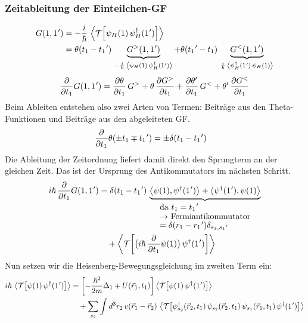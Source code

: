 \subsubsection*{Zeitableitung der Einteilchen-GF}
\begin{align}
  G(1,1\mkern1mu')
   & = -\frac{i}{\hbar}\,\left\langle\mathcal T\!\left[\psi_H(1)\,\psi_H^\dagger(1\mkern1mu')\right]\right\rangle \notag                                                                                                                                                           \\
   & = \theta(t_1-t_1\mkern1mu')\,\underbrace{G^>(1,1\mkern1mu')}_{-\frac{i}{\hbar}\,\left\langle\psi_H(1)\,\psi_H^\dagger(1\mkern1mu')\right\rangle} + \theta(t_1\mkern1mu'-t_1)\,\underbrace{G^<(1,1\mkern1mu')}_{\frac{i}{\hbar}\,\left\langle\psi_H^\dagger(1\mkern1mu')\,\psi_H(1)\right\rangle}
\end{align}
\begin{align}
  \frac{\partial}{\partial t_1} G(1,1\mkern1mu')
  = \frac{\partial \theta}{\partial t_1}\,G^> + \theta\,\frac{\partial G^>}{\partial t_1} + \frac{\partial \theta'}{\partial t_1}\,G^< + \theta'\,\frac{\partial G^<}{\partial t_1}
\end{align}
Beim Ableiten entstehen also zwei Arten von Termen: Beiträge aus den Theta-Funktionen und Beiträge aus den abgeleiteten GF\@.
\begin{align}
  \frac{\partial}{\partial t_1}\theta(\pm t_1\mp t_1\mkern1mu') & = \pm \delta(t_1-t_1\mkern1mu')
\end{align}
Die Ableitung der Zeitordnung liefert damit direkt den Sprungterm an der gleichen Zeit. Das ist der Ursprung des Antikommutators im nächsten Schritt.
\begin{align}
  i\hbar\,\frac{\partial}{\partial t_1}G(1,1\mkern1mu')
   & = \delta(t_1-t_1\mkern1mu')\,\underbrace{\erw{\psi(1),\psi^\dagger(1\mkern1mu')}+\erw{\psi^\dagger(1\mkern1mu'),\psi(1)}}_{\shortstack[l]{da $t_1=t_1\mkern1mu'$\\$\rightarrow$ Fermiantikommutator\\$=\delta(r_1-r_1\mkern1mu')\delta_{s_1,s_1\mkern1mu'}$}} \notag \\
   & \quad + \erw{\mathcal T\!\left[\bigl(i\hbar\,\frac{\partial}{\partial t_1}\psi(1)\bigr)\,\psi^\dagger(1\mkern1mu')\right]}
\end{align}
Nun setzen wir die Heisenberg-Bewegungsgleichung im zweiten Term ein:
\begin{align}
  i\hbar\,\left\langle\mathcal T\!\left[\psi(1)\,\psi^\dagger(1\mkern1mu')\right]\right\rangle
   & = \left[-\frac{\hbar^2}{2m}\Delta_{1} + U(\vec r_1,t_1)\right]\left\langle\mathcal T\!\left[\psi(1)\,\psi^\dagger(1\mkern1mu')\right]\right\rangle\notag                                                               \\
   & \quad + \sum_{s_2}\int d^3r_2\,v(\vec r_1-\vec r_2)\,\left\langle\mathcal T\!\left[\psi_{s_2}^\dagger(\vec r_2,t_1)\,\psi_{s_2}(\vec r_2,t_1)\,\psi_{s_1}(\vec r_1,t_1)\,\psi^\dagger(1\mkern1mu')\right]\right\rangle
\end{align}
